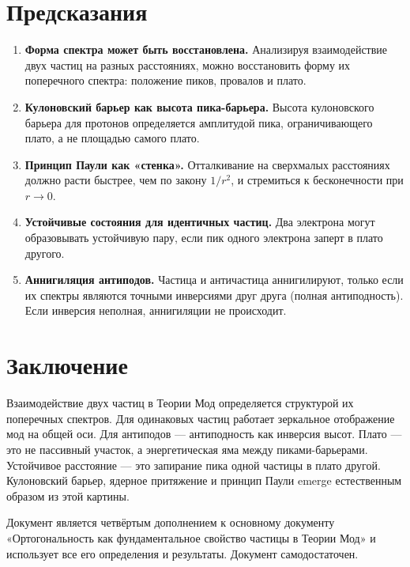 \documentclass[12pt,a4paper]{article}
\begin{document}
\section{Предсказания}
\begin{enumerate}[label=\arabic*.]
    \item \textbf{Форма спектра может быть восстановлена.} Анализируя взаимодействие двух частиц на разных расстояниях, можно восстановить форму их поперечного спектра: положение пиков, провалов и плато.
    \item \textbf{Кулоновский барьер как высота пика-барьера.} Высота кулоновского барьера для протонов определяется амплитудой пика, ограничивающего плато, а не площадью самого плато.
    \item \textbf{Принцип Паули как «стенка».} Отталкивание на сверхмалых расстояниях должно расти быстрее, чем по закону $1/r^2$, и стремиться к бесконечности при $r \to 0$.
    \item \textbf{Устойчивые состояния для идентичных частиц.} Два электрона могут образовывать устойчивую пару, если пик одного электрона заперт в плато другого.
    \item \textbf{Аннигиляция антиподов.} Частица и античастица аннигилируют, только если их спектры являются точными инверсиями друг друга (полная антиподность). Если инверсия неполная, аннигиляции не происходит.
\end{enumerate}

\section{Заключение}
Взаимодействие двух частиц в Теории Мод определяется структурой их поперечных спектров. Для одинаковых частиц работает зеркальное отображение мод на общей оси. Для антиподов --- антиподность как инверсия высот. Плато --- это не пассивный участок, а энергетическая яма между пиками-барьерами. Устойчивое расстояние --- это запирание пика одной частицы в плато другой. Кулоновский барьер, ядерное притяжение и принцип Паули emerge естественным образом из этой картины.

Документ является четвёртым дополнением к основному документу «Ортогональность как фундаментальное свойство частицы в Теории Мод» и использует все его определения и результаты. Документ самодостаточен.
\end{document}
